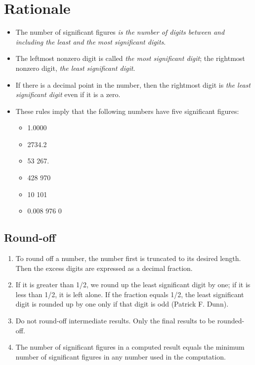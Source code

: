 \section*{Rationale}

\begin{itemize}

\item The number of significant figures \textit{is the number of digits between and including the least
and \emph{the most significant digits}}. 
\item The leftmost nonzero digit is called \emph{the most significant digit}; the rightmost nonzero digit, \emph{the least significant digit}.
\item If there is a decimal point in the number, then the rightmost digit is \emph{the least significant digit} even if it is a zero. 
\item These rules imply that the following
numbers have five significant figures:
\begin{itemize}
\item 1.0000
\item 2734.2
\item 53 267.
\item 428 970
\item 10 101
\item 0.008 976 0
\end{itemize} 

\end{itemize}

\subsection*{Round-off}

\begin{enumerate}
\item To round off a number, the number first is truncated to its desired length. Then the excess digits are expressed as a decimal fraction.
\item If it is greater than 1/2, we round up the least significant digit by one; if it is
less than 1/2, it is left alone. If the fraction equals 1/2, the least significant
digit is rounded up by one only if that digit is odd (Patrick F. Dunn).
\item Do not round-off intermediate results. Only the final results to be rounded-off.
\item The number of significant figures in a computed result equals the minimum number of significant figures in any number used in the computation.
\end{enumerate}


